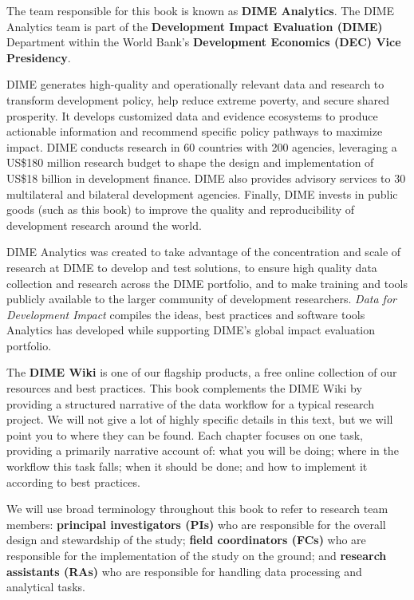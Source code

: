 The team responsible for this book is known as \textbf{DIME Analytics}.
The DIME Analytics team is part of the \textbf{Development Impact Evaluation (DIME)} Department
within the World Bank's \textbf{Development Economics (DEC) Vice Presidency}.

DIME generates high-quality and operationally relevant data and research
to transform development policy, help reduce extreme poverty, and secure shared prosperity.
It develops customized data and evidence ecosystems to produce actionable information
and recommend specific policy pathways to maximize impact.
DIME conducts research in 60 countries with 200 agencies, leveraging a
US\$180 million research budget to shape the design and implementation of
US\$18 billion in development finance.
DIME also provides advisory services to 30 multilateral and bilateral development agencies.
Finally, DIME invests in public goods (such as this book) to improve the quality and reproducibility of development research around the world.

DIME Analytics was created to take advantage of the concentration and scale of research at DIME to develop and test solutions,
to ensure high quality data collection and research across the DIME portfolio,
and to make training and tools publicly available to the larger community of development researchers.
\textit{Data for Development Impact} compiles the ideas, best practices and software tools Analytics
has developed while supporting DIME's global impact evaluation portfolio.

The \textbf{DIME Wiki} is one of our flagship products, a free online collection of our resources and best practices.
This book complements the DIME Wiki by providing a structured narrative of the data workflow for a typical research project.
We will not give a lot of highly specific details in this text,
but we will point you to where they can be found.
Each chapter focuses on one task, providing a primarily narrative account of:
what you will be doing; where in the workflow this task falls;
when it should be done; and how to implement it according to best practices.

We will use broad terminology throughout this book to refer to research team members:
\textbf{principal investigators (PIs)} who are responsible for
the overall design and stewardship of the study;
\textbf{field coordinators (FCs)} who are responsible for
the implementation of the study on the ground;
and \textbf{research assistants (RAs)} who are responsible for
handling data processing and analytical tasks.


